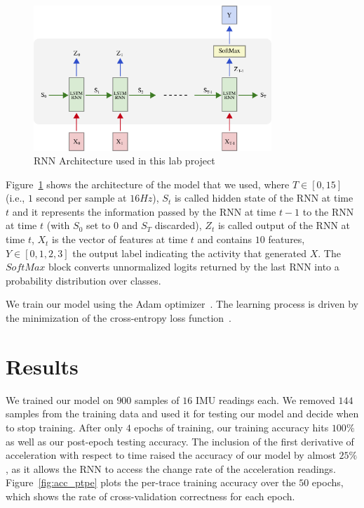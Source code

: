 \documentclass{article}
\begin{document}
\begin{figure}[t]
    \centering
    \vspace{-8pt}
    \includegraphics[width=0.8\textwidth]{figures/rnn_full}
    \caption{RNN Architecture used in this lab project \label{fig:rnn_architecture}}
    \vspace{-6pt}
\end{figure}

Figure~\ref{fig:rnn_architecture} shows the architecture of the model that we used, where
$T \in [0,15]$ (i.e., $1$ second per sample at $16Hz$), $S_t$ is called hidden state of the
RNN at time $t$ and it represents the information passed by the RNN at time $t-1$ to the RNN
at time $t$ (with $S_0$ set to $0$ and $S_T$ discarded), $Z_t$ is called output of the RNN
at time $t$, $X_t$ is the vector of features at time $t$ and contains $10$ features,
$Y \in [0,1,2,3]$ the output label indicating the activity that generated $X$.
The $SoftMax$ block converts
unnormalized logits returned by the last RNN into a probability distribution over classes.

We train our model using the Adam optimizer~\cite{kingma2014adam}.
The learning process is driven by the minimization of the cross-entropy loss
function~\cite{rubinstein1999cross}.


\section{Results}
\vspace{-.3cm}
We trained our model on $900$ samples of $16$ IMU readings each. We removed $144$ samples
from the training data and used it for testing our model and decide when to stop training.
After only $4$ epochs of training, our training accuracy hits $100\%$ as well as our
post-epoch testing accuracy.
The inclusion of the first derivative of acceleration with respect to time raised the accuracy
of our model by almost $25\%$, as it allows the RNN to access the change rate of the
acceleration readings. Figure~\ref{fig:acc_ptpe} plots the per-trace training
accuracy over the $50$ epochs, which shows the rate of cross-validation correctness
for each epoch.
\end{document}
